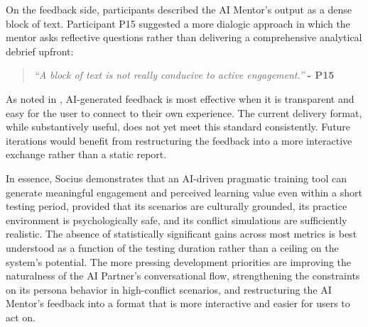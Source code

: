 \indent On the feedback side, participants described the AI Mentor's 
output as a dense block of text. Participant P15 suggested a more dialogic 
approach in which the mentor asks reflective questions rather than 
delivering a comprehensive analytical debrief upfront:

\begin{quote}
\textit{``A block of text is not really conducive to active engagement.''} 
\textbf{- P15}
\end{quote}

\noindent As noted in , AI-generated feedback is most 
effective when it is transparent and easy for the user to connect to their 
own experience. The current delivery format, while substantively useful, 
does not yet meet this standard consistently. Future iterations would 
benefit from restructuring the feedback into a more interactive exchange 
rather than a static report.

\indent In essence, Socius demonstrates that an AI-driven pragmatic 
training tool can generate meaningful engagement and perceived learning 
value even within a short testing period, provided that its scenarios are 
culturally grounded, its practice environment is psychologically safe, and 
its conflict simulations are sufficiently realistic. The absence of 
statistically significant gains across most metrics is best understood as a 
function of the testing duration rather than a ceiling on the system's 
potential. The more pressing development priorities are improving the 
naturalness of the AI Partner's conversational flow, strengthening the 
constraints on its persona behavior in high-conflict scenarios, and 
restructuring the AI Mentor's feedback into a format that is more 
interactive and easier for users to act on.

 
